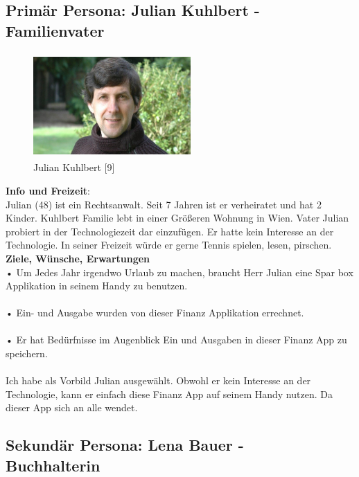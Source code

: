 \documentclass[runningheads,a4paper]{llncs}
\begin{document}
\clearpage

\subsection{Primär Persona: Julian Kuhlbert - \\Familienvater}

\begin{figure}
\centering
\includegraphics[height=4cm,width=6cm]{juliankuhlberg}
\caption{Julian Kuhlbert [9]}

\end{figure}
                                          
\textbf{Info und Freizeit}: \\
Julian (48) ist ein Rechtsanwalt. Seit 7 Jahren ist er verheiratet und hat 2 Kinder. Kuhlbert Familie lebt in einer Größeren Wohnung in Wien. Vater Julian probiert in der Technologiezeit dar einzufügen. Er hatte kein Interesse an der Technologie.
In seiner Freizeit würde er gerne Tennis spielen, lesen, pirschen.\\


\textbf{ Ziele, Wünsche, Erwartungen}\\

• Um Jedes Jahr irgendwo Urlaub zu machen, braucht Herr Julian eine Spar box Applikation in seinem Handy zu benutzen.\\\\
• Ein- und Ausgabe wurden von dieser Finanz Applikation errechnet. \\\\
• Er hat Bedürfnisse im Augenblick Ein und Ausgaben in dieser Finanz App zu speichern.\\\\
  Ich habe als Vorbild Julian ausgewählt. Obwohl er kein Interesse an der Technologie, kann er einfach diese Finanz App auf seinem Handy nutzen. Da dieser App sich an alle wendet.\\


\clearpage


\subsection{Sekundär Persona: Lena Bauer - \\Buchhalterin}
\end{document}
